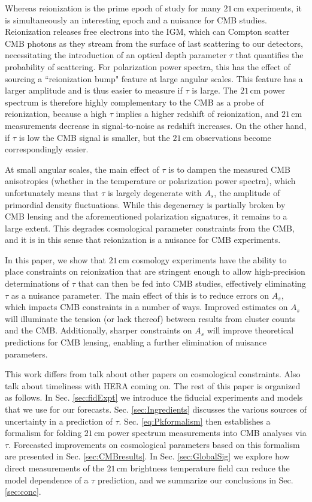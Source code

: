 \documentclass[twocolumn,aps,prd,nofootinbib,showpacs]{revtex4-1}
\begin{document}
Whereas reionization is the prime epoch of study for many $21\,\textrm{cm}$ experiments, it is simultaneously an interesting epoch and a nuisance for CMB studies. Reionization releases free electrons into the IGM, which can Compton scatter CMB photons as they stream from the surface of last scattering to our detectors, necessitating the introduction of an optical depth parameter $\tau$ that quantifies the probability of scattering. For polarization power spectra, this has the effect of sourcing a ``reionization bump" feature at large angular scales. This feature has a larger amplitude and is thus easier to measure if $\tau$ is large. The $21\,\textrm{cm}$ power spectrum is therefore highly complementary to the CMB as a probe of reionization, because a high $\tau$ implies a higher redshift of reionization, and $21\,\textrm{cm}$ measurements decrease in signal-to-noise as redshift increases. On the other hand, if $\tau$ is low the CMB signal is smaller, but the $21\,\textrm{cm}$ observations become correspondingly easier.

At small angular scales, the main effect of $\tau$ is to dampen the measured CMB anisotropies (whether in the temperature or polarization power spectra), which unfortunately means that $\tau$ is largely degenerate with $A_s$, the amplitude of primordial density fluctuations. While this degeneracy is partially broken by CMB lensing and the aforementioned polarization signatures, it remains to a large extent. This degrades cosmological parameter constraints from the CMB, and it is in this sense that reionization is a nuisance for CMB experiments.

In this paper, we show that $21\,\textrm{cm}$ cosmology experiments have the ability to place constraints on reionization that are stringent enough to allow high-precision determinations of $\tau$ that can then be fed into CMB studies, effectively eliminating $\tau$ as a nuisance parameter. The main effect of this is to reduce errors on $A_s$, which impacts CMB constraints in a number of ways. Improved estimates on $A_s$ will illuminate the tension (or lack thereof) between results from cluster counts and the CMB. Additionally, sharper constraints on $A_s$ will improve theoretical predictions for CMB lensing, enabling a further elimination of nuisance parameters.

This work differs from \acl{talk about other papers on cosmological constraints. Also talk about timeliness with HERA coming on}. The rest of this paper is organized as follows. In Sec. \ref{sec:fidExpt} we introduce the fiducial experiments and models that we use for our forecasts. Sec. \ref{sec:Ingredients} discusses the various sources of uncertainty in a prediction of $\tau$. Sec. \ref{eq:Pkformalism} then establishes a formalism for folding $21\,\textrm{cm}$ power spectrum measurements into CMB analyses via $\tau$. Forecasted improvements on cosmological parameters based on this formalism are presented in Sec. \ref{sec:CMBresults}. In Sec. \ref{sec:GlobalSig} we explore how direct measurements of the $21\,\textrm{cm}$ brightness temperature field can reduce the model dependence of a $\tau$ prediction, and we summarize our conclusions in Sec. \ref{sec:conc}.
\end{document}
